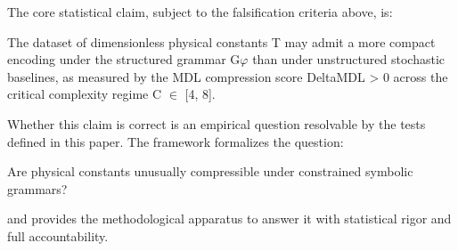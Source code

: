   The core statistical claim, subject to the falsification criteria above, is:

          The dataset of dimensionless physical constants T may admit a more compact
          encoding under the structured grammar G$\varphi$ than under unstructured stochastic
          baselines, as measured by the MDL compression score DeltaMDL > 0 across the
          critical complexity regime C $\in$ [4, 8].

  Whether this claim is correct is an empirical question resolvable by the tests defined in
  this paper. The framework formalizes the question:

  Are physical constants unusually compressible under constrained symbolic grammars?

  and provides the methodological apparatus to answer it with statistical rigor and full
  accountability.

